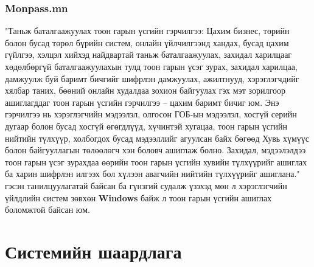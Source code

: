 \subsubsection{Monpass.mn}
"Таньж баталгаажуулах тоон гарын үсгийн гэрчилгээ: Цахим бизнес, төрийн болон бусад төрөл бүрийн систем, онлайн үйлчилгээнд хандах, бусад цахим гүйлгээ, хэлцэл хийхэд найдвартай таньж баталгаажуулах, захидал харилцааг хөдөлбөргүй баталгаажуулахын тулд тоон гарын үсэг зурах, захидал харилцаа, дамжуулж буй баримт бичгийг шифрлэн дамжуулах, ажилтнууд, хэрэглэгчдийг хялбар таних, бөөний онлайн худалдаа зохион байгуулах гэх мэт зорилгоор ашиглагддаг тоон гарын үсгийн гэрчилгээ – цахим баримт бичиг юм. Энэ гэрчилгээ нь хэрэглэгчийн мэдээлэл, олгосон ГОБ-ын мэдээлэл, хосгүй серийн дугаар болон бусад хосгүй өгөгдлүүд, хүчинтэй хугацаа, тоон гарын үсгийн нийтийн түлхүүр, холбогдох бусад мэдээллийг агуулсан байх бөгөөд Хувь хүмүүс болон байгууллагын төлөөлөгч хэн боловч ашиглаж болно. Захидал, мэдээлэлдээ тоон гарын үсэг зурахдаа өөрийн тоон гарын үсгийн хувийн түлхүүрийг ашиглах ба харин шифрлэн илгээх бол хүлээн авагчийн нийтийн түлхүүрийг ашиглана." гэсэн танилцуулагатай байсан ба гүнзгий судалж үзэхэд мөн л хэрэглэгчийн үйлдлийн систем зөвхөн \textbf{Windows} байж л тоон гарын үсгийн ашиглах боломжтой байсан юм.
\pagebreak
\section{Системийн шаардлага}
